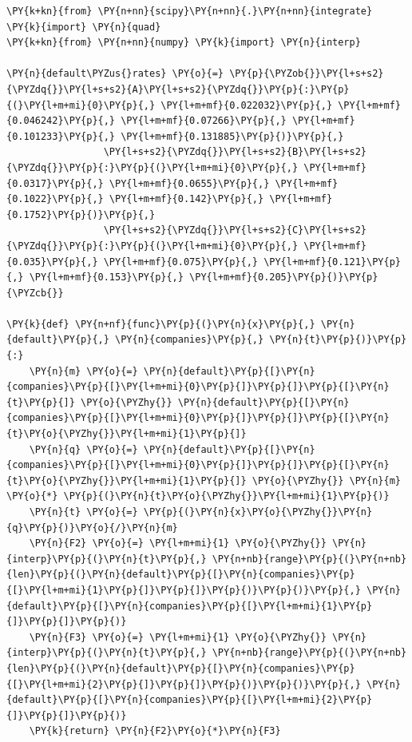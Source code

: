     \begin{tcolorbox}[breakable, size=fbox, boxrule=1pt, pad at break*=1mm,colback=cellbackground, colframe=cellborder]
\begin{Verbatim}[commandchars=\\\{\}]
\PY{k+kn}{from} \PY{n+nn}{scipy}\PY{n+nn}{.}\PY{n+nn}{integrate} \PY{k}{import} \PY{n}{quad}
\PY{k+kn}{from} \PY{n+nn}{numpy} \PY{k}{import} \PY{n}{interp}

\PY{n}{default\PYZus{}rates} \PY{o}{=} \PY{p}{\PYZob{}}\PY{l+s+s2}{\PYZdq{}}\PY{l+s+s2}{A}\PY{l+s+s2}{\PYZdq{}}\PY{p}{:}\PY{p}{(}\PY{l+m+mi}{0}\PY{p}{,} \PY{l+m+mf}{0.022032}\PY{p}{,} \PY{l+m+mf}{0.046242}\PY{p}{,} \PY{l+m+mf}{0.07266}\PY{p}{,} \PY{l+m+mf}{0.101233}\PY{p}{,} \PY{l+m+mf}{0.131885}\PY{p}{)}\PY{p}{,}
                 \PY{l+s+s2}{\PYZdq{}}\PY{l+s+s2}{B}\PY{l+s+s2}{\PYZdq{}}\PY{p}{:}\PY{p}{(}\PY{l+m+mi}{0}\PY{p}{,} \PY{l+m+mf}{0.0317}\PY{p}{,} \PY{l+m+mf}{0.0655}\PY{p}{,} \PY{l+m+mf}{0.1022}\PY{p}{,} \PY{l+m+mf}{0.142}\PY{p}{,} \PY{l+m+mf}{0.1752}\PY{p}{)}\PY{p}{,}
                 \PY{l+s+s2}{\PYZdq{}}\PY{l+s+s2}{C}\PY{l+s+s2}{\PYZdq{}}\PY{p}{:}\PY{p}{(}\PY{l+m+mi}{0}\PY{p}{,} \PY{l+m+mf}{0.035}\PY{p}{,} \PY{l+m+mf}{0.075}\PY{p}{,} \PY{l+m+mf}{0.121}\PY{p}{,} \PY{l+m+mf}{0.153}\PY{p}{,} \PY{l+m+mf}{0.205}\PY{p}{)}\PY{p}{\PYZcb{}}

\PY{k}{def} \PY{n+nf}{func}\PY{p}{(}\PY{n}{x}\PY{p}{,} \PY{n}{default}\PY{p}{,} \PY{n}{companies}\PY{p}{,} \PY{n}{t}\PY{p}{)}\PY{p}{:}
    \PY{n}{m} \PY{o}{=} \PY{n}{default}\PY{p}{[}\PY{n}{companies}\PY{p}{[}\PY{l+m+mi}{0}\PY{p}{]}\PY{p}{]}\PY{p}{[}\PY{n}{t}\PY{p}{]} \PY{o}{\PYZhy{}} \PY{n}{default}\PY{p}{[}\PY{n}{companies}\PY{p}{[}\PY{l+m+mi}{0}\PY{p}{]}\PY{p}{]}\PY{p}{[}\PY{n}{t}\PY{o}{\PYZhy{}}\PY{l+m+mi}{1}\PY{p}{]}
    \PY{n}{q} \PY{o}{=} \PY{n}{default}\PY{p}{[}\PY{n}{companies}\PY{p}{[}\PY{l+m+mi}{0}\PY{p}{]}\PY{p}{]}\PY{p}{[}\PY{n}{t}\PY{o}{\PYZhy{}}\PY{l+m+mi}{1}\PY{p}{]} \PY{o}{\PYZhy{}} \PY{n}{m} \PY{o}{*} \PY{p}{(}\PY{n}{t}\PY{o}{\PYZhy{}}\PY{l+m+mi}{1}\PY{p}{)}
    \PY{n}{t} \PY{o}{=} \PY{p}{(}\PY{n}{x}\PY{o}{\PYZhy{}}\PY{n}{q}\PY{p}{)}\PY{o}{/}\PY{n}{m}
    \PY{n}{F2} \PY{o}{=} \PY{l+m+mi}{1} \PY{o}{\PYZhy{}} \PY{n}{interp}\PY{p}{(}\PY{n}{t}\PY{p}{,} \PY{n+nb}{range}\PY{p}{(}\PY{n+nb}{len}\PY{p}{(}\PY{n}{default}\PY{p}{[}\PY{n}{companies}\PY{p}{[}\PY{l+m+mi}{1}\PY{p}{]}\PY{p}{]}\PY{p}{)}\PY{p}{)}\PY{p}{,} \PY{n}{default}\PY{p}{[}\PY{n}{companies}\PY{p}{[}\PY{l+m+mi}{1}\PY{p}{]}\PY{p}{]}\PY{p}{)}
    \PY{n}{F3} \PY{o}{=} \PY{l+m+mi}{1} \PY{o}{\PYZhy{}} \PY{n}{interp}\PY{p}{(}\PY{n}{t}\PY{p}{,} \PY{n+nb}{range}\PY{p}{(}\PY{n+nb}{len}\PY{p}{(}\PY{n}{default}\PY{p}{[}\PY{n}{companies}\PY{p}{[}\PY{l+m+mi}{2}\PY{p}{]}\PY{p}{]}\PY{p}{)}\PY{p}{)}\PY{p}{,} \PY{n}{default}\PY{p}{[}\PY{n}{companies}\PY{p}{[}\PY{l+m+mi}{2}\PY{p}{]}\PY{p}{]}\PY{p}{)}
    \PY{k}{return} \PY{n}{F2}\PY{o}{*}\PY{n}{F3}


\end{Verbatim}
\end{tcolorbox}
